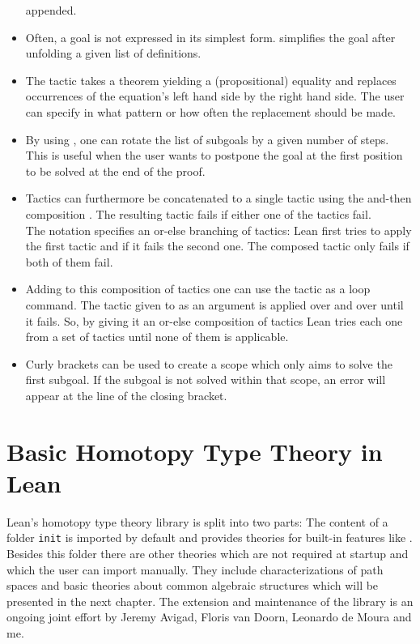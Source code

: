 \begin{itemize}
appended.
\item Often, a goal is not expressed in its simplest form.
 simplifies the goal after unfolding a given list of definitions.
\item The  tactic takes a theorem yielding a (propositional)
equality and replaces occurrences of the equation's left hand side by the 
right hand side.
The user can specify in what pattern or how often the replacement should be made.
\item By using , one can rotate the list of subgoals by a given
number of steps.
This is useful when the user wants to postpone the goal at the first position
to be solved at the end of the proof.
\item Tactics can furthermore be concatenated to a single tactic using the and-then
composition .
The resulting tactic fails if either one of the tactics fail. \\
The notation  specifies an or-else branching of tactics:
Lean first tries to apply the first tactic and if it fails the second one.
The composed tactic only fails if both of them fail.
\item Adding to this composition of tactics one can use the 
tactic as a loop command.
The tactic given to  as an argument is applied over and over until
it fails.
So, by giving it an or-else composition of tactics Lean tries each one from a set
of tactics until none of them is applicable.
\item Curly brackets can be used to create a scope which only aims to solve the
first subgoal.
If the subgoal is not solved within that scope, an error will appear at the line
of the closing bracket. %
\end{itemize} %

\section{Basic Homotopy Type Theory in Lean}

Lean's homotopy type theory library is split into two parts:
The content of a folder \texttt{init} is imported by default and provides
theories for built-in features like .
Besides this folder there are other theories which are not required at startup
and which the user can import manually.
They include characterizations of path spaces and basic theories about common
algebraic structures which will be presented in the next chapter.
The extension and maintenance of the library is an ongoing joint effort by
Jeremy Avigad, Floris van Doorn, Leonardo de Moura and me.

